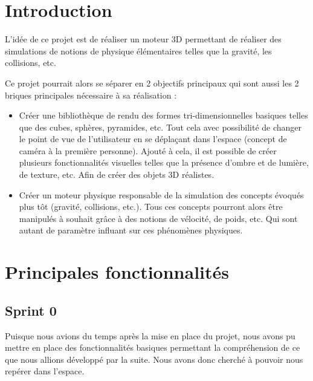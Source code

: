 \documentclass[11pt]{report}
\begin{document}


\tableofcontents


\chapter{Introduction}

L'idée de ce projet est de réaliser un moteur 3D permettant de réaliser des simulations de notions de physique élémentaires telles que la gravité, les collisions, etc.\newline

Ce projet pourrait alors se séparer en 2 objectifs principaux qui sont aussi les 2 briques principales nécessaire à sa réalisation :\newline

\begin{itemize}
  \item Créer une bibliothèque de rendu des formes tri-dimensionnelles basiques telles que des cubes, sphères, pyramides, etc. Tout cela avec possibilité de changer le point de vue de l'utilisateur en se déplaçant dans l'espace (concept de caméra à la première personne). Ajouté à cela, il est possible de créer plusieurs fonctionnalités visuelles telles que la présence d'ombre et de lumière, de texture, etc. Afin de créer des objets 3D réalistes.\newline

  \item Créer un moteur physique responsable de la simulation des concepts évoqués plus tôt (gravité, collisions, etc.). Tous ces concepts pourront alors être manipulés à souhait grâce à des notions de vélocité, de poids, etc. Qui sont autant de paramètre influant sur ces phénomènes physiques.\newline
\end{itemize}


\chapter{Principales fonctionnalités}

\section{Sprint 0}

Puisque nous avions du temps après la mise en place du projet, nous avons pu
mettre en place des fonctionnalités basiques permettant la compréhension
de ce que nous allions développé par la suite. Nous avons donc cherché à pouvoir nous repérer dans l'espace.
\end{document}
